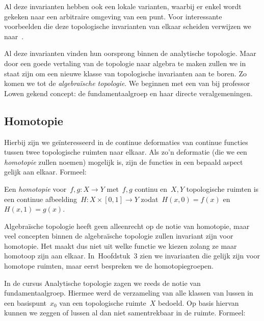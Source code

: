 \documentclass[a4paper,11pt,openany,oneside,article]{memoir}
\begin{document}
Al deze invarianten hebben ook een lokale varianten, waarbij er enkel wordt gekeken naar een arbitraire omgeving van een punt. Voor interessante voorbeelden die deze topologische invarianten van elkaar scheiden verwijzen we naar~\cite{counterexamples-in-topology}.
\vspace{1em}

Al deze invarianten vinden hun oorsprong binnen de analytische topologie. Maar door een goede vertaling van de topologie naar algebra te maken zullen we in staat zijn om een nieuwe klasse van topologische invarianten aan te boren. Zo komen we tot de \emph{algebra\"ische topologie}. We beginnen met een van bij professor Lowen gekend concept: de fundamentaalgroep en haar directe veralgemeningen.

\subsection{Homotopie}
Hierbij zijn we ge\"interesseerd in de continue deformaties van continue functies tussen twee topologische ruimten naar elkaar. Als zo'n deformatie (die we een \emph{homotopie} zullen noemen) mogelijk is, zijn de functies in een bepaald aspect gelijk aan elkaar. Formeel:

\begin{definition}
  Een \emph{homotopie} voor~$f,g\colon X\to Y$ met~$f,g$ continu en~$X,Y$ topologische ruimten is een continue afbeelding~$H\colon X\times[0,1]\to Y$ zodat~$H(x,0)=f(x)$ en~$H(x,1)=g(x)$.
\end{definition}

Algebra\"ische topologie heeft geen alleenrecht op de notie van homotopie, maar veel concepten binnen de algebra\"ische topologie zullen invariant zijn voor homotopie. Het maakt dus niet uit welke functie we kiezen zolang ze maar homotoop zijn aan elkaar. In~Hoofdstuk~3 zien we invarianten die gelijk zijn voor homotope ruimten, maar eerst bespreken we de homotopiegroepen.

In de cursus Analytische topologie zagen we reeds de notie van fundamentaalgroep. Hiermee werd de verzameling van alle klassen van lussen in een basispunt~$x_0$ van een topologische ruimte~$X$ bedoeld. Op basis hiervan kunnen we zeggen of lussen al dan niet samentrekbaar in de ruimte. Formeel:
\end{document}
